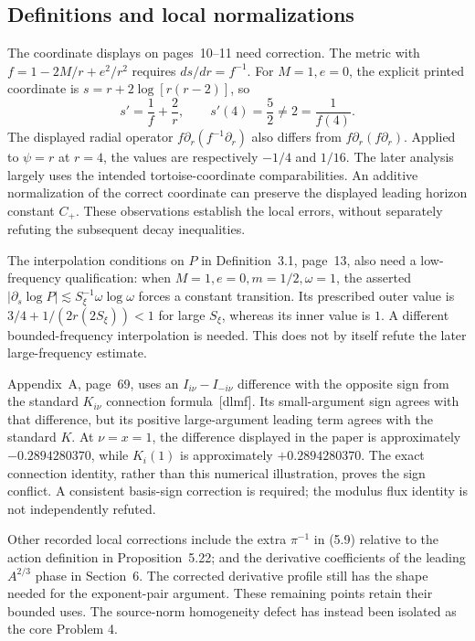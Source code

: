 \documentclass[10pt]{article}
\begin{document}
\subsection*{Definitions and local normalizations}
The coordinate displays on pages 10–11 need correction. The metric with \(f=1-2M/r+e^2/r^2\) requires \(ds/dr=f^{-1}\). For \(M=1,e=0\), the explicit printed coordinate is \(s=r+2\log[r(r-2)]\), so \[s'=\frac1f+\frac2r,
 \qquad s'(4)=\frac52\ne2=\frac1{f(4)}.\] The displayed radial operator \(f\partial_r(f^{-1}\partial_r)\) also differs from \(f\partial_r(f\partial_r)\). Applied to \(\psi=r\) at \(r=4\), the values are respectively \(-1/4\) and \(1/16\). The later analysis largely uses the intended tortoise-coordinate comparabilities. An additive normalization of the correct coordinate can preserve the displayed leading horizon constant \(C_+\). These observations establish the local errors, without separately refuting the subsequent decay inequalities.\par
The interpolation conditions on \(P\) in Definition 3.1, page 13, also need a low-frequency qualification: when \(M=1,e=0,m=1/2,\omega=1\), the asserted \(|\partial_s\log P|\lesssim S_\xi^{-1}\omega\log\omega\) forces a constant transition. Its prescribed outer value is \(3/4+1/(2r(2S_\xi))<1\) for large \(S_\xi\), whereas its inner value is \(1\). A different bounded-frequency interpolation is needed. This does not by itself refute the later large-frequency estimate.\par
Appendix A, page 69, uses an \(I_{i\nu}-I_{-i\nu}\) difference with the opposite sign from the standard \(K_{i\nu}\) connection formula [dlmf]. Its small-argument sign agrees with that difference, but its positive large-argument leading term agrees with the standard \(K\). At \(\nu=x=1\), the difference displayed in the paper is approximately \(-0.2894280370\), while \(K_i(1)\) is approximately \(+0.2894280370\). The exact connection identity, rather than this numerical illustration, proves the sign conflict. A consistent basis-sign correction is required; the modulus flux identity is not independently refuted.\par
Other recorded local corrections include the extra \(\pi^{-1}\) in (5.9) relative to the action definition in Proposition 5.22; and the derivative coefficients of the leading \(A^{2/3}\) phase in Section 6. The corrected derivative profile still has the shape needed for the exponent-pair argument. These remaining points retain their bounded uses. The source-norm homogeneity defect has instead been isolated as the core Problem 4.\par
\end{document}
